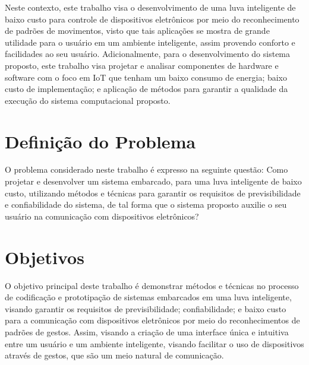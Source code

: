 Neste contexto, este trabalho visa o desenvolvimento de uma luva inteligente de baixo custo para controle de dispositivos eletrônicos por meio do reconhecimento de padrões de movimentos, visto que tais aplicações se mostra de grande utilidade para o usuário em um ambiente inteligente, assim provendo conforto e facilidades ao seu usuário. Adicionalmente, para o desenvolvimento do sistema proposto, este trabalho visa projetar e analisar componentes de hardware e software com o foco em IoT que tenham um baixo consumo de energia; baixo custo de implementação; e aplicação de métodos para garantir a qualidade da execução do sistema computacional proposto.


\section{Definição do Problema}

O problema considerado neste trabalho é expresso na seguinte questão: Como projetar e desenvolver um sistema embarcado, para uma luva inteligente de baixo custo, utilizando métodos e técnicas para garantir os requisitos de previsibilidade e confiabilidade do sistema, de tal forma que o sistema proposto auxilie o seu usuário na comunicação com dispositivos eletrônicos?




\section{Objetivos}

O objetivo principal deste trabalho é demonstrar métodos e técnicas no processo de codificação e prototipação de sistemas embarcados em uma luva inteligente, visando garantir os requisitos de previsibilidade; confiabilidade; e baixo custo para a comunicação com dispositivos eletrônicos por meio do reconhecimentos de padrões de gestos. Assim, visando a criação de uma interface única e intuitiva entre um usuário e um ambiente inteligente, visando facilitar o uso de dispositivos através de gestos, que são um meio natural de comunicação.



